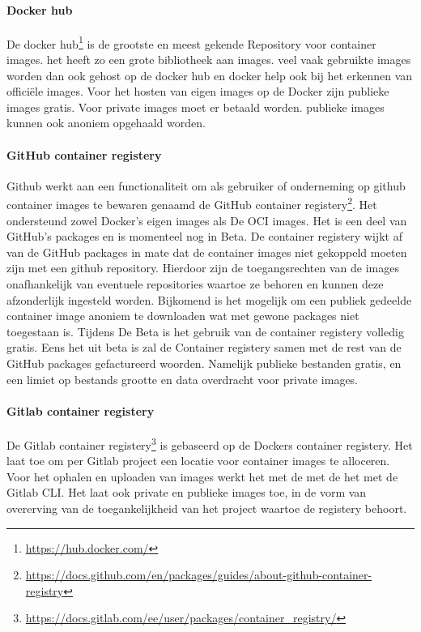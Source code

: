 \paragraph{Docker hub}
De docker hub\footnote{\url{https://hub.docker.com/}} is de grootste en meest gekende Repository voor container images. het heeft zo een grote bibliotheek aan images. veel vaak gebruikte images worden dan ook gehost op de docker hub en docker help ook bij het erkennen van officiële images. Voor het hosten van eigen images op de Docker zijn publieke images gratis. Voor private images moet er betaald worden. publieke images kunnen ook anoniem opgehaald worden.
\paragraph{GitHub container registery}
Github werkt aan een functionaliteit om als gebruiker of onderneming op github container images te bewaren genaamd de  GitHub container registery\footnote{\url{https://docs.github.com/en/packages/guides/about-github-container-registry}}. Het ondersteund zowel Docker’s eigen images als De OCI images. Het is een deel van GitHub’s packages en is momenteel nog in Beta. De container registery wijkt af van de GitHub packages in mate dat de container images niet gekoppeld moeten zijn met een github repository. Hierdoor zijn de toegangsrechten van de images onafhankelijk van eventuele repositories waartoe ze behoren en kunnen deze afzonderlijk ingesteld worden. Bijkomend is het mogelijk om een publiek gedeelde container image anoniem te downloaden wat met gewone packages niet toegestaan is. Tijdens De Beta is het gebruik van de container registery volledig gratis. Eens het uit beta is zal de Container registery samen met de rest van de GitHub packages gefactureerd woorden. Namelijk publieke bestanden gratis, en een limiet op bestands grootte en data overdracht voor private images.
\paragraph{Gitlab container registery}
De Gitlab container registery\footnote{\url{https://docs.gitlab.com/ee/user/packages/container_registry/}} is gebaseerd op de Dockers container registery. Het laat toe om per Gitlab project een locatie voor container images te alloceren. Voor het ophalen en uploaden van images werkt het met de met de het met de Gitlab CLI. Het laat ook private en publieke images toe, in de vorm van overerving van de toegankelijkheid van het project waartoe de registery behoort. 


